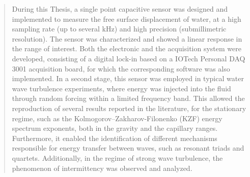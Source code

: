\begin{abstract}  %


  		
During this Thesis, a single point capacitive sensor was designed and implemented to measure the free surface displacement of water, at a high sampling rate (up to several kHz) and high precision (submillimetric resolution). The sensor was characterized and showed a linear response in the range of interest. Both the electronic and the acquisition system were developed, consisting of a digital lock-in based on a IOTech Personal DAQ 3001 acquisition board, for which the corresponding software was also implemented.  	In a second stage, this sensor was employed in typical water wave turbulence experiments, where energy was injected into the fluid through random forcing within a limited frequency band. This allowed the reproduction of several results reported in the literature, for the stationary regime, such as the Kolmogorov–Zakharov-Filonenko (KZF) energy spectrum exponents, both in the gravity and the capillary ranges. Furthermore, it enabled the identification of different mechanisms responsible for energy transfer between waves, such as resonant triads and quartets. Additionally, in the regime of strong wave turbulence, the phenomenon of intermittency was observed and analyzed. 
 	
 	 
 	
\end{abstract} %

